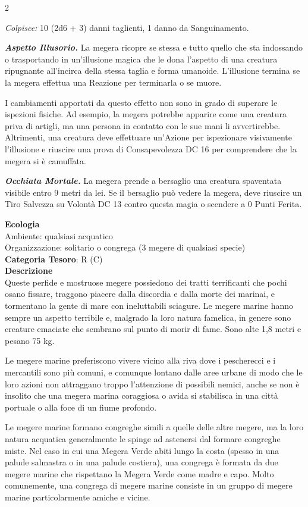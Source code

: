 \begin{multicols}{2}
{\emph{Colpisce:} 10 (2d6 + 3) danni taglienti, 1 danno da Sanguinamento.

\emph{\textbf{Aspetto Illusorio.}} La megera ricopre se stessa e tutto quello che sta indossando o trasportando in un'illusione magica che le dona l'aspetto di una creatura ripugnante all'incirca della stessa taglia e forma umanoide. L'illusione termina se la megera effettua una Reazione per terminarla o se muore.

I cambiamenti apportati da questo effetto non sono in grado di superare le ispezioni fisiche. Ad esempio, la megera potrebbe apparire come una creatura priva di artigli, ma una persona in contatto con le sue mani li avvertirebbe. Altrimenti, una creatura deve effettuare un'Azione per ispezionare visivamente l'illusione e riuscire una prova di Consapevolezza DC 16 per comprendere che la megera si è camuffata.

\emph{\textbf{Occhiata Mortale.}} La megera prende a bersaglio una creatura spaventata visibile entro 9 metri da lei. Se il bersaglio può vedere la megera, deve riuscire un Tiro Salvezza su Volontà DC 13 contro questa magia o scendere a 0 Punti Ferita.

\textbf{Ecologia}\\
Ambiente: qualsiasi acquatico\\
Organizzazione: solitario o congrega (3 megere di qualsiasi specie)\\
\textbf{Categoria Tesoro}: R (C)\\
\textbf{Descrizione}\\
Queste perfide e mostruose megere possiedono dei tratti terrificanti che pochi osano fissare, traggono piacere dalla discordia e dalla morte dei marinai, e tormentano la gente di mare con ineluttabili sciagure. Le megere marine hanno sempre un aspetto terribile e, malgrado la loro natura famelica, in genere sono creature emaciate che sembrano sul punto di morir di fame. Sono alte 1,8 metri e pesano 75 kg.

Le megere marine preferiscono vivere vicino alla riva dove i pescherecci e i mercantili sono più comuni, e comunque lontano dalle aree urbane di modo che le loro azioni non attraggano troppo l'attenzione di possibili nemici, anche se non è insolito che una megera marina coraggiosa o avida si stabilisca in una città portuale o alla foce di un fiume profondo.

Le megere marine formano congreghe simili a quelle delle altre megere, ma la loro natura acquatica generalmente le spinge ad astenersi dal formare congreghe miste. Nel caso in cui una Megera Verde abiti lungo la costa (spesso in una palude salmastra o in una palude costiera), una congrega è formata da due megere marine che rispettano la Megera Verde come madre e capo. Molto comunemente, una congrega di megere marine consiste in un gruppo di megere marine particolarmente amiche e vicine.

}
\end{multicols}
